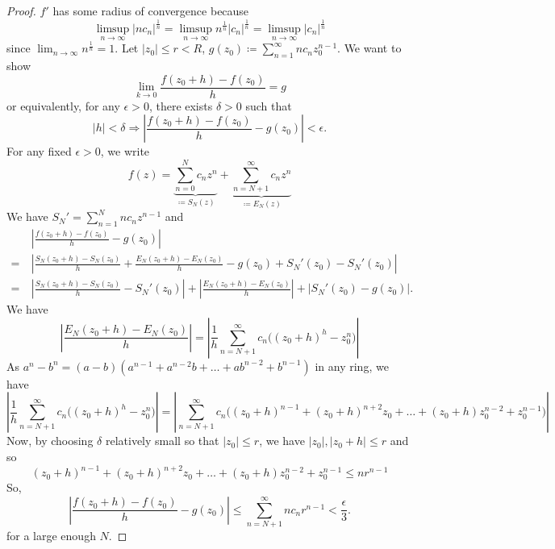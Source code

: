\documentclass[11pt]{article}
\begin{document}
\begin{proof}
$f'$ has some radius of convergence because
\begin{equation*}
\limsup_{n\to\infty}|nc_n|^{\frac{1}{n}}
= \limsup_{n\to\infty}n^{\frac{1}{n}}|c_n|^{\frac{1}{n}}
= \limsup_{n\to\infty}|c_n|^{\frac{1}{n}}
\end{equation*}
since $\displaystyle\lim_{n\to\infty}n^{\frac{1}{n}} = 1$. Let $|z_0| \leq r <
R$, $\displaystyle g(z_0) \coloneqq \sum^\infty_{n=1} nc_nz_0^{n-1}$. We want to
show
\begin{equation*}
\lim_{k\to 0} \frac{f(z_0+h) - f(z_0)}{h} = g
\end{equation*}
or equivalently, for any $\epsilon > 0$, there exists $\delta > 0$ such that
\begin{equation*}
|h| < \delta \Rightarrow \left|\frac{f(z_0+h) - f(z_0)}{h} - g(z_0)\right| <
\epsilon.
\end{equation*}
For any fixed $\epsilon > 0$, we write
\begin{equation*}
f(z) = \underbrace{\sum^N_{n=0}c_nz^n}_{\coloneqq S_N(z)} +
\underbrace{\sum^\infty_{n=N+1}c_nz^n}_{\coloneqq E_N(z)} 
\end{equation*}
We have $S_N' = \sum^N_{n=1}nc_nz^{n-1}$ and
\begin{align*}
&\>\left|\frac{f(z_0+h) - f(z_0)}{h} - g(z_0)\right|\\
=&\> \left|\frac{S_N(z_0+h) - S_N(z_0)}{h} + \frac{E_N(z_0+h) - E_N(z_0)}{h} -
g(z_0) + S_N'(z_0) -S_N'(z_0)\right|\\
=&\> \left|\frac{S_N(z_0+h) - S_N(z_0)}{h} - S_N'(z_0) \right|
+ \left|\frac{E_N(z_0+h) - E_N(z_0)}{h}\right| + \left|S_N'(z_0) -
g(z_0)\right|.
\end{align*}
We have
\begin{equation*}
\left|\frac{E_N(z_0+h) - E_N(z_0)}{h}\right|
= \left|\frac{1}{h} \sum^\infty_{n=N+1}c_n \big((z_0+h)^h -z_0^n\big)\right|
\end{equation*}
As $a^n -b^n = (a-b)(a^{n-1} + a^{n-2}b + \dots+ab^{n-2} + b^{n-1})$ in any
ring, we have
\begin{equation*}
\left|\frac{1}{h} \sum^\infty_{n=N+1}c_n \big((z_0+h)^h -z_0^n\big)\right|
= \left|\sum^{\infty}_{n=N+1}c_n\big((z_0+h)^{n-1} + (z_0+h)^{n+2}z_0 + \dots +
(z_0+h)z_0^{n-2} + z_0^{n-1}\big)\right|
\end{equation*}
Now, by choosing $\delta$ relatively small so that $|z_0|\leq r $, we have
$|z_0|, |z_0+h| \leq r$ and so
\begin{equation*}
(z_0+h)^{n-1} + (z_0+h)^{n+2}z_0 + \dots + (z_0+h)z_0^{n-2} + z_0^{n-1} \leq nr^{n-1}
\end{equation*}
So,
\begin{equation*}
\left|\frac{f(z_0+h) - f(z_0)}{h} - g(z_0)\right| \leq
\sum^\infty_{n=N+1}nc_nr^{n-1} < \frac{\epsilon}{3}.
\end{equation*}
for a large enough $N$.
\end{proof}
\end{document}
